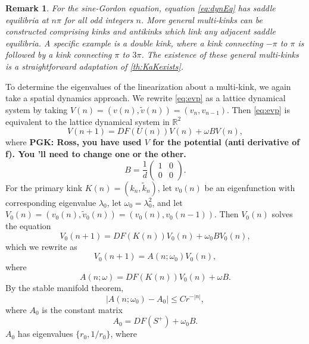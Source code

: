 \documentclass[12pt,reqno]{amsart}
\def\R{{\mathbb R}}
\newtheorem{remark}{Remark}
\begin{document}
\begin{remark}\label{rem:SGmulitkinks}
For the sine-Gordon equation, equation \cref{eq:dynEq} has saddle equilibria at $n \pi$ for all odd integers $n$. More general multi-kinks can be constructed comprising kinks and antikinks which link any adjacent saddle equilibria. A specific example is a double kink, where a kink  connecting $-\pi$ to $\pi$ is followed by a kink connecting $\pi$ to $3 \pi$. The existence of these general multi-kinks is a straightforward adaptation of \cref{th:KaKexists}.
\end{remark}

To determine the eigenvalues of the linearization about a multi-kink, we again take a spatial dynamics approach. We rewrite \cref{eq:evp} as a lattice dynamical system by taking $V(n) = (v(n), \tilde{v}(n)) = (v_n, v_{n-1})$. Then \cref{eq:evp} is equivalent to the lattice dynamical system in $\R^2$
\begin{equation}\label{eq:EVPdyneq}
V(n+1) = D F( U(n) )V(n) + \omega B V(n),
\end{equation}
where
{\bf PGK: Ross, you have used $V$ for the potential (anti
derivative of f). You 'll need to change one or the other.}
\[
B = \frac{1}{d}
\begin{pmatrix}1 & 0 \\ 0 & 0
\end{pmatrix}.
\] 
For the primary kink $K(n) = (k_n, \tilde{k}_n)$, let $v_0(n)$ be an eigenfunction with corresponding eigenvalue $\lambda_0$, let $\omega_0 = \lambda_0^2$, and let $V_0(n) = (v_0(n), \tilde{v}_0(n)) = (v_0(n), v_0(n-1))$. Then $V_0(n)$ solves the equation
\begin{equation}\label{eq:V0eq}
V_0(n+1) = D F( K(n) )V_0(n) + \omega_0 B V_0(n),
\end{equation}
which we rewrite as
\begin{equation}\label{eq:V0Aeq}
	V_0(n+1) = A(n; \omega_0) V_0(n),
\end{equation}
where
\begin{equation}\label{eq:Aomegaeq}
	A(n; \omega) = D F( K(n) )V_0(n) + \omega B.
\end{equation}
By the stable manifold theorem, 
\begin{equation}\label{eq:A0decay}
	|A(n; \omega_0) - A_0| \leq C r^{-|n|},
\end{equation}
where $A_0$ is the constant matrix
\begin{equation}
	A_0 = DF(S^+) + \omega_0 B.
\end{equation}
$A_0$ has eigenvalues $\{ r_0, 1/r_0 \}$, where
\end{document}

